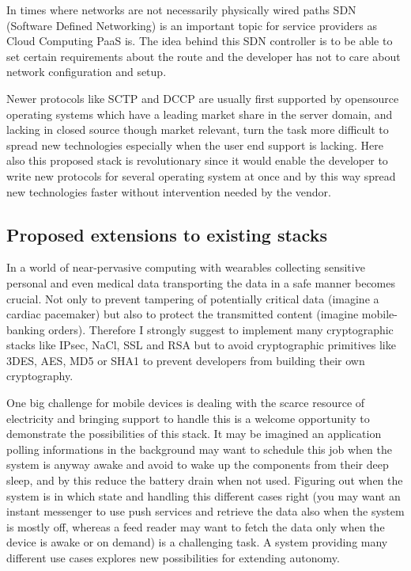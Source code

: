 \documentclass[twocolumn,english]{IEEEtran}
\theoremstyle{plain}
\theoremstyle{plain}
\begin{document}
In times where networks are not necessarily physically wired paths SDN
(Software Defined Networking) is an important topic for service providers as
Cloud Computing PaaS is. The idea behind this SDN controller is to be able to
set certain requirements about the route and the developer has not to care
about network configuration and setup.

Newer protocols like SCTP and DCCP are usually first supported by opensource
operating systems which have a leading market share in the server
domain\cite{w3techs:os-web}, and lacking in closed source though market
relevant, turn the task more difficult to spread new technologies especially
when the user end support is lacking\cite{netmarketshare:desktop-os}. Here
also this proposed stack is revolutionary since it would enable the developer
to write new protocols for several operating system at once and by this way
spread new technologies faster without intervention needed by the vendor.

\subsection{Proposed extensions to existing stacks}

In a world of near-pervasive computing with wearables collecting sensitive
personal and even medical data transporting the data in a safe manner becomes
crucial. Not only to prevent tampering of potentially critical data (imagine a
cardiac pacemaker) but also to protect the transmitted content (imagine
mobile-banking orders). Therefore I strongly suggest to implement many
cryptographic stacks like IPsec, NaCl, SSL and RSA but to avoid cryptographic
primitives like 3DES, AES, MD5 or SHA1 to prevent developers from building
their own cryptography.

One big challenge for mobile devices is dealing with the scarce resource of
electricity and bringing support to handle this is a welcome opportunity to
demonstrate the possibilities of this stack. It may be imagined an application
polling informations in the background may want to schedule this job when the
system is anyway awake and avoid to wake up the components from their deep
sleep, and by this reduce the battery drain when not used. Figuring out when
the system is in which state and handling this different cases right (you may
want an instant messenger to use push services and retrieve the data also when
the system is mostly off, whereas a feed reader may want to fetch the data
only when the device is awake or on demand) is a challenging task. A system
providing many different use cases explores new possibilities for extending
autonomy.
\end{document}
